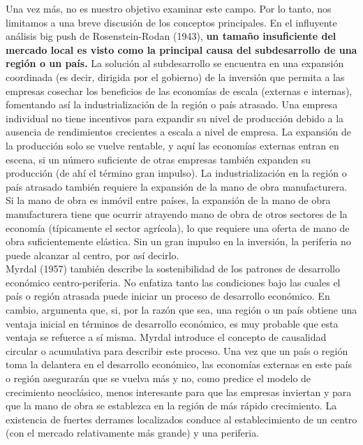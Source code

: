 Una vez más, no es nuestro objetivo examinar este campo. Por lo tanto, nos limitamos a una breve discusión de los conceptos principales. En el influyente análisis big push de Rosenstein-Rodan (1943), \textbf{un tamaño insuficiente del mercado local es visto como la principal causa del subdesarrollo de una región o un país.} La solución al subdesarrollo se encuentra en una expansión coordinada (es decir, dirigida por el gobierno) de la inversión que permita a las empresas cosechar los beneficios de las economías de escala (externas e internas), fomentando así la industrialización de la región o país atrasado. Una empresa individual no tiene incentivos para expandir su nivel de producción debido a la ausencia de rendimientos crecientes a escala a nivel de empresa. La expansión de la producción solo se vuelve rentable, y aquí las economías externas entran en escena, si un número suficiente de otras empresas también expanden su producción (de ahí el término gran impulso). La industrialización en la región o país atrasado también requiere la expansión de la mano de obra manufacturera. Si la mano de obra es inmóvil entre países, la expansión de la mano de obra manufacturera tiene que ocurrir atrayendo mano de obra de otros sectores de la economía (típicamente el sector agrícola), lo que requiere una oferta de mano de obra suficientemente elástica. Sin un gran impulso en la inversión, la periferia no puede alcanzar al centro, por así decirlo.\\
Myrdal (1957) también describe la sostenibilidad de los patrones de desarrollo económico centro-periferia. No enfatiza tanto las condiciones bajo las cuales el país o región atrasada puede iniciar un proceso de desarrollo económico. En cambio, argumenta que, si, por la razón que sea, una región o un país obtiene una ventaja inicial en términos de desarrollo económico, es muy probable que esta ventaja se refuerce a sí misma. Myrdal introduce el concepto de causalidad circular o acumulativa para describir este proceso. Una vez que un país o región toma la delantera en el desarrollo económico, las economías externas en este país o región asegurarán que se vuelva más y no, como predice el modelo de crecimiento neoclásico, menos interesante para que las empresas inviertan y para que la mano de obra se establezca en la región de más rápido crecimiento. La existencia de fuertes derrames localizados conduce al establecimiento de un centro (con el mercado relativamente más grande) y una periferia.\\
